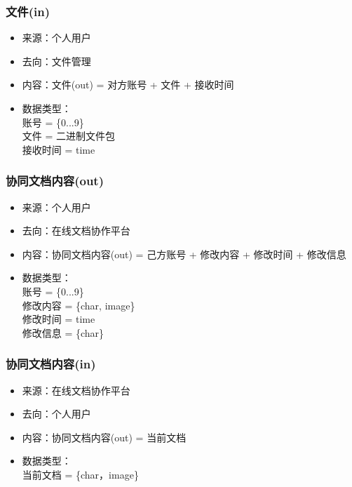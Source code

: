             \subsubsection{文件(in)}
            \begin{itemize}
                \item 来源：个人用户
                \item 去向：文件管理
                \item 内容：文件(out) = 对方账号 + 文件 + 接收时间
                \item 数据类型：\\
                账号 = \{0...9\}\\
                文件 = 二进制文件包\\
                接收时间 = time\\
            \end{itemize}
            \subsubsection{协同文档内容(out)}
            \begin{itemize}
                \item 来源：个人用户
                \item 去向：在线文档协作平台
                \item 内容：协同文档内容(out) = 己方账号 + 修改内容 + 修改时间 + 修改信息
                \item 数据类型：\\
                账号 = \{0...9\}\\
                修改内容 = \{char, image\}\\
                修改时间 = time\\
                修改信息 = \{char\}\\
            \end{itemize}
            \subsubsection{协同文档内容(in)}
            \begin{itemize}
                \item 来源：在线文档协作平台
                \item 去向：个人用户
                \item 内容：协同文档内容(out) = 当前文档
                \item 数据类型：\\
                当前文档 = \{char，image\}\\
            \end{itemize}
